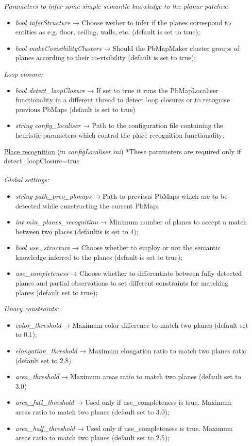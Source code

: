 \documentclass[a4paper,11pt]{article}
\begin{document}
\emph{Parameters to infer some simple semantic knowledge to the planar patches:}
\begin{itemize}
\item \emph{bool inferStructure} →  Choose wether to infer if the planes correspond to entities as e.g. floor, ceiling, walls, etc. (default is set to true);
\item \emph{bool makeCovisibilityClusters} → Should the PbMapMaker cluster groups of planes according to their co-visibility (default is set to true);

\end{itemize}
\emph{Loop closure:}
\begin{itemize}
\item \emph{bool detect\_loopClosure} → If set to true it runs the PbMapLocaliser functionality in a different thread to detect loop closures or to recognise previous PbMaps (default is set to true)
\item \emph{string config\_localiser} → Path to the configuration file containing the heuristic parameters which control the place recognition functionality;
\\

\end{itemize}
\underline{Place recognition} (in \emph{configLocaliser.ini}) *These parameters are required only if detect\_loopClosure=true \\
\\
\emph{Global settings:}
\begin{itemize}
\item \emph{string path\_prev\_pbmaps} → Path to previous PbMaps which are to be detected while cunstructing the current PbMap;
\item \emph{int min\_planes\_recognition} → Minimum number of planes to accept a match between two places (defaultis is set to 4);
\item \emph{bool use\_structure} → Choose whether to employ or not the semantic knowledge inferred to the planes (default is set to true);
\item \emph{use\_completeness} → Choose whether to differentiate between fully detected planes and partial observations to set different constraints for matching planes (default set to true);

\end{itemize}
\emph{Unary constraints:}
\begin{itemize}
\item \emph{color\_threshold} → Maximum color difference to match two planes (default set to 0.1);
\item \emph{elongation\_threshold} → Maximum elongation ratio to match two planes ratio (default set to 2.8)     
\item \emph{area\_threshold} → Maximum areas ratio to match two planes (default set to 3.0)	              
\item \emph{area\_full\_threshold} → Used only if use\_completeness is true. Maximum areas ratio to match two planes (default set to 3.0);
\item \emph{area\_half\_threshold} → Used only if use\_completeness is true. Maximum areas ratio to match two planes (default set to 2.5);

\end{itemize}
\end{document}
